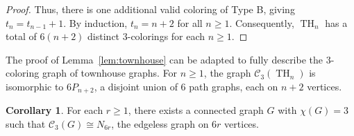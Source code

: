 \documentclass{amsart}
\theoremstyle{hypothesisstyle}
\theoremstyle{definition}
\newtheorem{corollary}[theorem]{Corollary}
\theoremstyle{remark}
\numberwithin{equation}{section}
\begin{document}
\begin{proof}
Thus, there is one additional valid coloring of Type B, giving $t_n = t_{n-1} + 1$. By induction, $t_n = n + 2$ for all $n \geq 1$. Consequently, $\operatorname{TH}_n$ has a total of $6(n+2)$ distinct $3$-colorings for each $n \geq 1$. \end{proof}

The proof of Lemma~\ref{lem:townhouse} can be adapted to fully describe the $3$-coloring graph of townhouse graphs. For $n\geq 1$, the graph $\mathcal{C}_3(\operatorname{TH}_n)$ is isomorphic to $6P_{n+2}$, a disjoint union of $6$ path graphs, each on $n+2$ vertices.

\begin{corollary}\label{cor:3-chromatic-isolated} For each $r\geq 1$, there exists a connected graph $G$ with $\chi(G)=3$ such that $\mathcal{C}_3(G)\cong N_{6r}$, the edgeless graph on $6r$ vertices.
\end{corollary}
\end{document}
